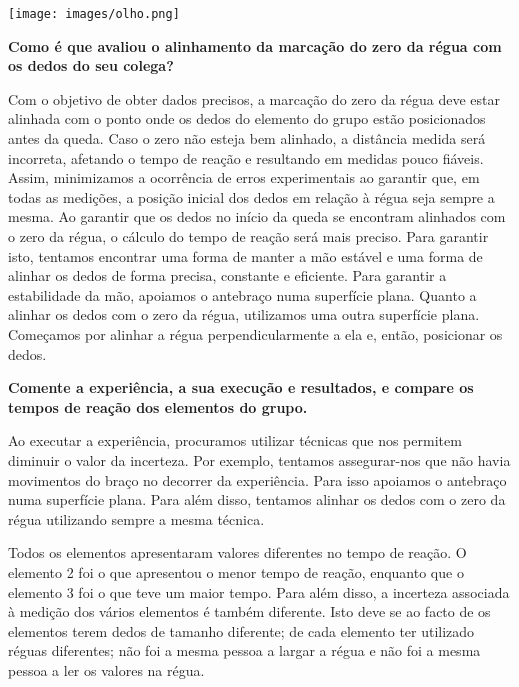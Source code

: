 \texttt{[image: images/olho.png]}
\vspace{150mm}


\textbf{Como é que avaliou o alinhamento da marcação do zero da régua com os dedos do seu colega? }


   Com o objetivo de obter dados precisos, a marcação do zero da régua deve estar alinhada com o ponto onde os dedos do elemento do grupo estão posicionados antes da queda. Caso o zero não esteja bem alinhado, a distância medida será incorreta, afetando o tempo de reação e resultando em medidas pouco fiáveis. Assim, minimizamos a ocorrência de erros experimentais ao garantir que, em todas as medições, a posição inicial dos dedos em relação à régua seja sempre a mesma.  Ao garantir que os dedos no início da queda se encontram alinhados com o zero da régua, o cálculo do tempo de reação será mais preciso.                          Para garantir isto, tentamos encontrar uma forma de manter a mão estável e uma forma de alinhar os dedos de forma precisa, constante e eficiente. Para garantir a estabilidade da mão, apoiamos o antebraço numa superfície plana. Quanto a alinhar os dedos com o zero da régua, utilizamos uma outra superfície plana. Começamos por alinhar a régua perpendicularmente a ela e, então, posicionar os dedos.
\\

\textbf{Comente a experiência, a sua execução e resultados, e compare os tempos de reação dos elementos do grupo. }

Ao executar a experiência, procuramos utilizar técnicas que nos permitem diminuir o valor da incerteza. Por exemplo, tentamos assegurar-nos que não havia movimentos do braço no decorrer da experiência. Para isso apoiamos o antebraço numa superfície plana. Para além disso, tentamos alinhar os dedos com o zero da régua utilizando sempre a mesma técnica.  

Todos os elementos apresentaram valores diferentes no tempo de reação. O elemento 2 foi o que apresentou o menor tempo de reação, enquanto que o elemento 3 foi o que teve um maior tempo. Para além disso, a incerteza associada à medição dos vários elementos é também diferente. Isto deve se ao facto de os elementos terem dedos de tamanho diferente; de cada elemento ter utilizado réguas diferentes; não foi a mesma pessoa a largar a régua e não foi a mesma pessoa a ler os valores na régua. 
\\

